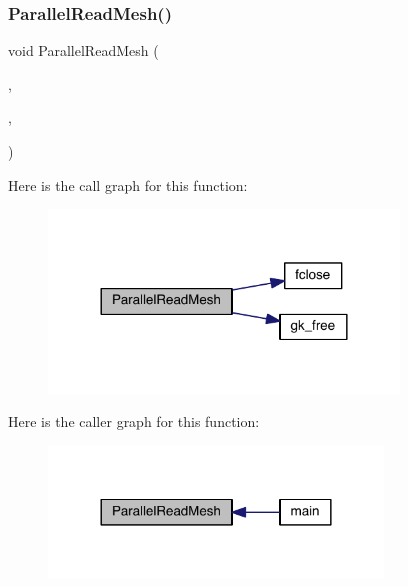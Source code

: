 \subsubsection{\texorpdfstring{Parallel\+Read\+Mesh()}{ParallelReadMesh()}}
{\footnotesize\ttfamily void Parallel\+Read\+Mesh (\begin{DoxyParamCaption}\item[{\hyperlink{a00738}{mesh\+\_\+t} $\ast$}]{,  }\item[{char $\ast$}]{,  }\item[{M\+P\+I\+\_\+\+Comm}]{ }\end{DoxyParamCaption})}

Here is the call graph for this function\+:\nopagebreak
\begin{figure}[H]
\begin{center}
\leavevmode
\includegraphics[width=264pt]{a00954_ad1d29ead9f4773175b1f6bbdccf4b44c_cgraph}
\end{center}
\end{figure}
Here is the caller graph for this function\+:\nopagebreak
\begin{figure}[H]
\begin{center}
\leavevmode
\includegraphics[width=252pt]{a00954_ad1d29ead9f4773175b1f6bbdccf4b44c_icgraph}
\end{center}
\end{figure}
\mbox{\label{a00954_a779688e907e334b05cb76755bce1ae74}} 
